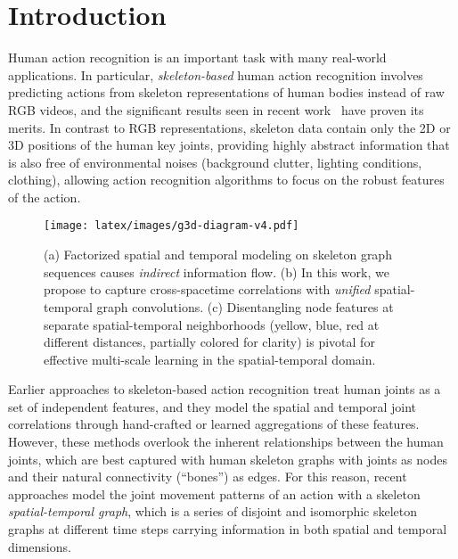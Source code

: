 \documentclass[10pt,twocolumn,letterpaper]{article}
\begin{document}
\section{Introduction} \label{sec:intro}


Human action recognition is an important task with many real-world applications.
In particular, \textit{skeleton-based} human action recognition involves predicting actions from skeleton representations of human bodies instead of raw RGB videos, and the significant results seen in recent work~\cite{ST-GCN, 2s-AGCN, dgnn, attention-gcn-lstm-cvpr2019, AS-GCN-skeleton-cvpr19, li2018co-human-skeleton-ijcai18, view-adaptive-human-skeleton-iccv2017, spatial-reasoning-tempora-stack-human-skeleton} have proven its merits.
In contrast to RGB representations, skeleton data contain only the 2D \cite{ST-GCN, kinetics-dataset} or 3D \cite{ntu60, ntu-rgbd-120} positions of the human key joints, providing highly abstract information that is also free of environmental noises (\eg background clutter, lighting conditions, clothing), allowing action recognition algorithms to focus on the robust features of the action.

\begin{figure}[t]
\centering
\texttt{[image: latex/images/g3d-diagram-v4.pdf]}
\caption{
   (a) Factorized spatial and temporal modeling on skeleton graph sequences causes \textit{indirect} information flow.
   (b) In this work, we propose to capture cross-spacetime correlations with \textit{unified} spatial-temporal graph convolutions.
   (c) Disentangling node features at separate spatial-temporal neighborhoods (\textcolor{Dandelion}{yellow}, \textcolor{NavyBlue}{blue}, \textcolor{BrickRed}{red} at different distances, partially colored for clarity) is pivotal for effective multi-scale learning in the spatial-temporal domain.
}
\label{fig:intro-figure}
\vspace{-3mm}
\end{figure}


Earlier approaches to skeleton-based action recognition treat human joints as a set of independent features, and they model the spatial and temporal joint correlations through hand-crafted \cite{lie-group-human-skeleton, wang2012mining} or learned \cite{ntu60, hierarchical-rnn-human-skeleton, memory-attention-net-human-skeleton, view-adaptive-human-skeleton-iccv2017} aggregations of these features.
However, these methods overlook the inherent relationships between the human joints, which are best captured with human skeleton graphs with joints as nodes and their natural connectivity (\ie ``bones'') as edges.
For this reason, recent approaches \cite{ST-GCN, st-gcn-concur-18, attention-gcn-lstm-cvpr2019, spatial-reasoning-tempora-stack-human-skeleton, dgnn} model the joint movement patterns of an action with a skeleton \textit{spatial-temporal graph}, which is a series of disjoint and isomorphic skeleton graphs at different time steps carrying information in both spatial and temporal dimensions.
\end{document}
